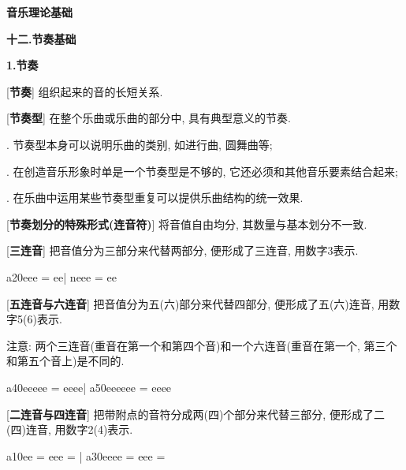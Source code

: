 

\begin{center} 
 \Large \textbf{音乐理论基础}\par
 \textbf{十二.节奏基础}
\end{center}

\large 
\begin{center}
 \textbf{1.节奏}\\
\end{center}

[\textbf{节奏}] 组织起来的音的长短关系.
\par

[\textbf{节奏型}] 在整个乐曲或乐曲的部分中, 具有典型意义的节奏.\par
{}. 节奏型本身可以说明乐曲的类别, 如进行曲, 圆舞曲等;\par
{}. 在创造音乐形象时单是一个节奏型是不够的, 它还必须和其他音乐要素结合起来;\par
{}. 在乐曲中运用某些节奏型重复可以提供乐曲结构的统一效果.\par

[\textbf{节奏划分的特殊形式(连音符)}] 将音值自由均分, 其数量与基本划分不一致.\par

[\textbf{三连音}] 把音值分为三部分来代替两部分, 便形成了三连音, 用数字3表示.\par
\startextract
\Notes \downtuplet a20\qa e\qa e\qa e \en
\Notes = \qa e\qa e\en\bar
\Notes \triolet n\Tqbu eee\en
\Notes = \Dqbu ee\en
\zendextract

[\textbf{五连音与六连音}] 把音值分为五(六)部分来代替四部分, 便形成了五(六)连音, 用数字5(6)表示.\par
\qquad 注意: 两个三连音(重音在第一个和第四个音)和一个六连音(重音在第一个, 第三个和第五个音上)是不同的.\par
\startextract
\Notes {}\downtuplet a40\qa e\qa e\qa e\qa e\qa e\en
\Notes = \qa e\qa e\qa e\qa e\en\bar
\Notes \def\tuplettxt{6}\downtuplet a50\qa e\qa e\qa e\qa e\qa e\qa e\en
\Notes = \qa e\qa e\qa e\qa e\en
\zendextract

[\textbf{二连音与四连音}] 把带附点的音符分成两(四)个部分来代替三部分, 便形成了二(四)连音, 用数字2(4)表示.\par
\startextract
\Notes \def\tuplettxt{2}\downtuplet a10\qa e\qa e\en
\Notes = \qa e\qa e\qa e\en
\Notes = \en\bar
\Notes \def\tuplettxt{4}\downtuplet a30\qa e\qa e\qa e\qa e\en
\Notes = \qa e\qa e\qa e\en
\Notes = \en
\zendextract

